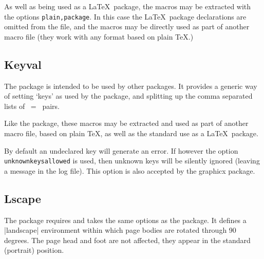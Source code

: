 As well as being used as a \LaTeX\ package, the macros may be extracted
with the  options \texttt{plain,package}. In this case
the \LaTeX\ package declarations are omitted from the file, and the
macros may be directly used as part of another macro file (they work
with any format based on plain \TeX.)

\subsection{Keyval}
The  package is intended to be used by other
packages. It provides a generic way of setting `keys' as used by the
 package, and splitting up the comma separated lists
of ~=~ pairs.

Like the  package, these macros may be extracted and used
as part of another macro file, based on plain \TeX, as well as the
standard use as a \LaTeX\ package.

By default an undeclared key will generate an error.
If however the option  \texttt{unknownkeysallowed} is used, then
unknown keys will be silently ignored (leaving a message in the log
file). This option is also accepted by the \textsf{graphicx} package.

\iffalse

\subsection{Pstcol}
\package{PSTricks}, by Timothy Van Zandt is an immensely powerful
package that enables a very full featured interface between PostScript
and \TeX. Unfortunately the colour support in \package{PSTricks} is
slightly incompatible with the colour mechanism defined in the
\package{color} package. The \package{pstcol} package is a (hopefully
temporary) package that modifies a very small number of internal
PSTricks functions, to remove this incompatibility. If
\package{pstricks} is loaded via this package, you may use any colours
defined by \package{color} package commands within \package{pstricks}
commands, and vice versa.

\fi

\subsection{Lscape}
The  package requires and takes the same options
as the  package. It defines a |landscape| environment
within which page bodies are rotated through 90 degrees. The page head
and foot are not affected, they appear in the standard (portrait)
position.

